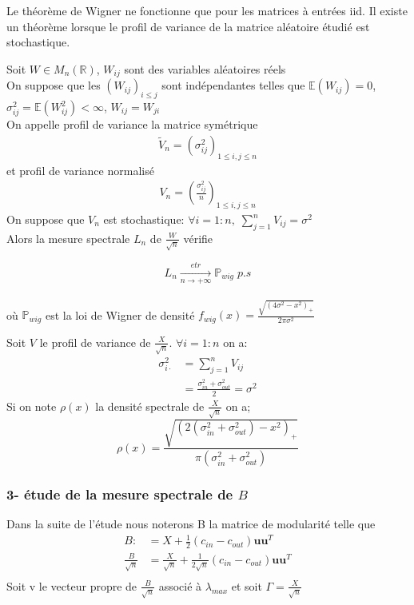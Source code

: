 Le théorème de Wigner ne fonctionne que pour les matrices à entrées iid. 
Il existe un théorème lorsque le profil de variance de la matrice aléatoire étudié est stochastique.
\begin{theorem}\label{th:1}
Soit $W \in M_{n}(\mathbb{R})$, $W_{ij}$ sont des variables aléatoires réels\\
On suppose que les $(W_{ij})_{i \leq j}$ sont indépendantes telles que $\mathbb{E}(W_{ij}) = 0$, $\sigma_{ij}^2 = \mathbb{E}(W_{ij}^2) < \infty$, $W_{ij} = W_{ji}$\\
On appelle profil de variance la matrice symétrique
\begin{align*}
	\tilde V_n = (\sigma_{ij}^2)_{1 \leq i,j \leq n}
\end{align*}
et profil de variance normalisé 
\begin{align*}
	V_n = \left(\frac{\sigma_{ij}^2}{n}\right)_{1 \leq i,j \leq n}
\end{align*}
On suppose que $V_n$ est stochastique: $\forall i = 1:n , \; \sum_{j=1}^{n}V_{ij} = \sigma^2$\\
Alors la mesure spectrale $L_{n}$ de $\frac{W}{\sqrt{n}}$ vérifie

\begin{equation}
	L_n\xrightarrow[n \to +\infty]{etr} \mathbb{P}_{wig}\nonumber \; p.s
\end{equation}\\
où $\mathbb{P}_{wig}$ est la loi de Wigner de densité $f_{wig}(x)= \frac{\sqrt{(4\sigma^2 - x^2)_+}}{2\pi\sigma^2}$
\end{theorem}

Soit $V$ le profil de variance de $\frac{X}{\sqrt{n}}$. $\forall i = 1:n$ on a: 
\begin{align*} 
\sigma_{i \cdot}^2 &= \sum_{j=1}^{n}V_{ij}  \\
 		&= \boxed{\frac{\sigma_{in}^2 + \sigma_{out}^2}{2} = \sigma^2}
\end{align*}
Si on note $\rho(x)$ la densité spectrale de $\frac{X}{\sqrt{n}}$ on a;
\begin{equation}
	\rho(x) = \frac{\sqrt{(2(\sigma_{in}^2 + \sigma_{out}^2) - x^2)_+}}{\pi(\sigma_{in}^2 + \sigma_{out}^2)}
\end{equation}

\subsubsection*{3- étude de la mesure spectrale de $B$}
Dans la suite de l'étude nous noterons B la matrice de modularité telle que 
\begin{align*} 
B :&= X + \frac{1}{2}(c_{in} - c_{out})\mathbf{uu}^T \\
\frac{B}{\sqrt{n}} &= \frac{X}{\sqrt{n}} + \frac{1}{2\sqrt{n}}(c_{in} - c_{out})\mathbf{uu}^T\\
\end{align*}
Soit v le vecteur propre de $\frac{B}{\sqrt{n}}$ associé à $\lambda_{max}$ et soit $\Gamma = \frac{X}{\sqrt{n}}$

